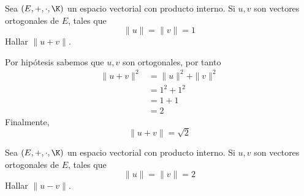 \documentclass[compacto,10pt]{pubciencias-notas}
\begin{document}
\begin{ejem}
    Sea $(E,+,\cdot,\K)$ un espacio vectorial con producto interno.
    Si $u,v$ son vectores ortogonales de $E$, tales que 
    \[
    \|u\|=\|v\|=1
    \]
    Hallar $\|u+v\|$.

    Por hipótesis sabemos que $u,v$ son ortogonales, por tanto 
    \begin{align*}
        \|u+v\|^2&=\|u\|^2+\|v\|^2\\
        &=1^2+1^2\\
        &=1+1\\
        &=2
    \end{align*}
    Finalmente, 
    \[
    \|u+v\|=\sqrt{2}
    \]
\end{ejem}
\begin{ejer}
    Sea $(E,+,\cdot,\K)$ un espacio vectorial con producto interno.
    Si $u,v$ son vectores ortogonales de $E$, tales que 
    \[
    \|u\|=\|v\|=2
    \]
    Hallar $\|u-v\|$.
\end{ejer}

\end{document}
